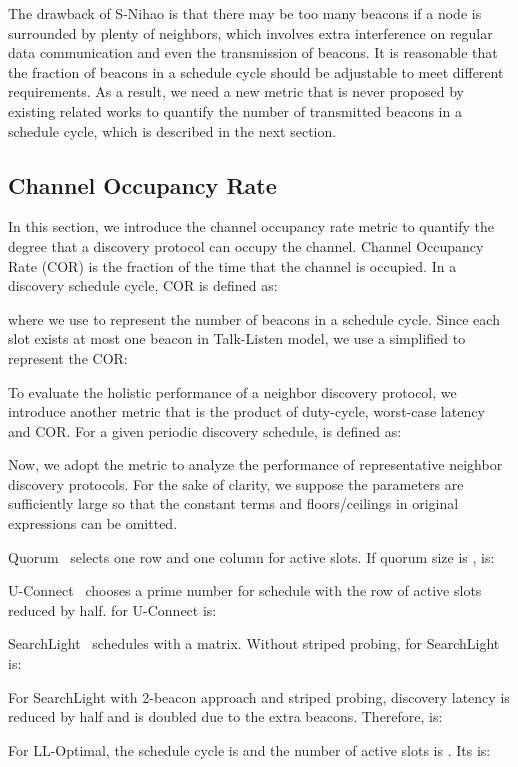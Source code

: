 \documentclass[conference]{IEEEtran}
\begin{document}
The drawback of S-Nihao is that there may be too many beacons if a node is surrounded by plenty of neighbors, which involves extra interference on regular data communication and even the transmission of beacons.
It is reasonable that the fraction of beacons in a schedule cycle should be adjustable to meet different requirements.
As a result, we need a new metric that is never proposed by existing related works to quantify the number of transmitted beacons in a schedule cycle,
which is described in the next section.

\subsection{Channel Occupancy Rate}\label{channeloccupancy}
In this section, we introduce the channel occupancy rate metric to quantify the degree that a discovery protocol can occupy the channel.
Channel Occupancy Rate (COR) is the fraction of the time that the channel is occupied.
In a discovery schedule cycle, COR is defined as:

where we use  to represent the number of beacons in a schedule cycle.
Since each slot exists at most one beacon in Talk-Listen model, we use a simplified  to represent the COR:


To evaluate the holistic performance of a neighbor discovery protocol,
we introduce another metric  that is the product of duty-cycle, worst-case latency and COR.
For a given periodic discovery schedule,  is defined as:


Now, we adopt the  metric to analyze the performance of representative neighbor discovery protocols.
For the sake of clarity, we suppose the parameters are sufficiently large
so that the constant terms and floors/ceilings in original expressions can be omitted.

Quorum~\cite{tseng2003power} selects one row and one column for active slots.
If quorum size is ,  is:

U-Connect~\cite{kandhalu2010u} chooses a prime number  for schedule with the row of active slots reduced by half.  for U-Connect is:

SearchLight~\cite{bakht2012mobicom} schedules with a  matrix. Without striped probing,  for SearchLight is:

For SearchLight with 2-beacon approach and striped probing, discovery latency is reduced by half and  is doubled due to the extra beacons.
Therefore,  is:

For LL-Optimal, the schedule cycle is  and the number of active slots is . Its  is:
\end{document}
